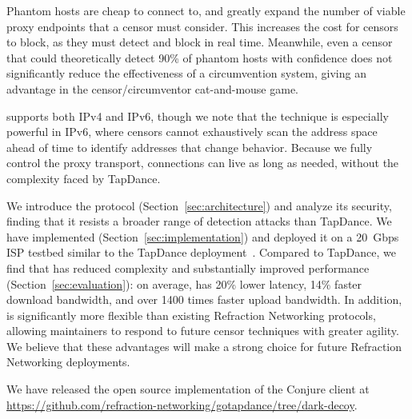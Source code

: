 \documentclass[sigconf]{acmart}
\begin{document}
Phantom hosts are cheap to connect to, and greatly expand the 
number of viable proxy endpoints that a censor must consider. This increases the cost for censors to
block, as they must detect and block in real time. Meanwhile, even a censor that
could theoretically detect 90\% of phantom hosts with confidence does not significantly reduce the
effectiveness of a circumvention system, giving \scheme an advantage in the censor/circumventor
cat-and-mouse game.

\scheme supports both IPv4 and IPv6,
though we note that the technique is especially
powerful in IPv6, where censors cannot exhaustively scan the address space
ahead of time to identify addresses that change behavior.
Because we fully control the proxy transport, connections can live as
long as needed, without the complexity faced by TapDance.




We introduce the \scheme protocol (Section~\ref{sec:architecture})
and analyze its security, finding that it resists a broader
range of detection attacks than TapDance.
We have implemented \scheme (Section~\ref{sec:implementation})
and deployed it on a 20~Gbps ISP testbed similar to the TapDance
deployment~\cite{frolov2017isp}.  Compared to TapDance, we find that
\scheme has reduced complexity and substantially improved performance
(Section~\ref{sec:evaluation}): on average, \scheme has 20\% lower latency,
14\% faster download bandwidth, and over 1400 times faster upload bandwidth.
In addition, \scheme is significantly more
flexible than existing Refraction Networking protocols, allowing maintainers to
respond to future censor techniques with greater agility.
We believe that these advantages will
make \scheme a strong choice for future Refraction Networking deployments.

We have released the open source implementation of the Conjure client at 
\url{https://github.com/refraction-networking/gotapdance/tree/dark-decoy}.
\end{document}
